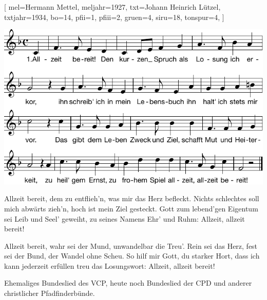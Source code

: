 [
    mel={Hermann Mettel}, 
    meljahr={1927},
    txt={Johann Heinrich Lützel}, 
    txtjahr={1934},
    bo={14}, 
    pfii={1}, 
    pfiii={2}, 
    gruen={4}, 
    siru={18},
    tonspur={4},
]

\beginverse 
\endverse  
\includegraphics[draft=false, width=1\textwidth]{Noten/Lied003.pdf}	

\beginverse
Allzeit bereit, dem zu entflieh'n, was mir das Herz befleckt.
Nichts schlechtes soll mich abwärts zieh'n, hoch ist mein Ziel gesteckt.
Gott zum lebend'gen Eigentum sei Leib und Seel' geweiht,
zu seines Namens Ehr' und Ruhm: Allzeit, allzeit bereit!
\endverse

\beginverse
Allzeit bereit, wahr sei der Mund, unwandelbar die Treu'.
Rein sei das Herz, fest sei der Bund, der Wandel ohne Scheu.
So hilf mir Gott, du starker Hort, dass ich kann jederzeit
erfüllen treu das Losungswort: Allzeit, allzeit bereit!
\endverse

\endsong

\beginscripture{}
Ehemaliges Bundeslied des VCP, heute noch Bundeslied der CPD und anderer christlicher Pfadfinderbünde.
\endscripture
